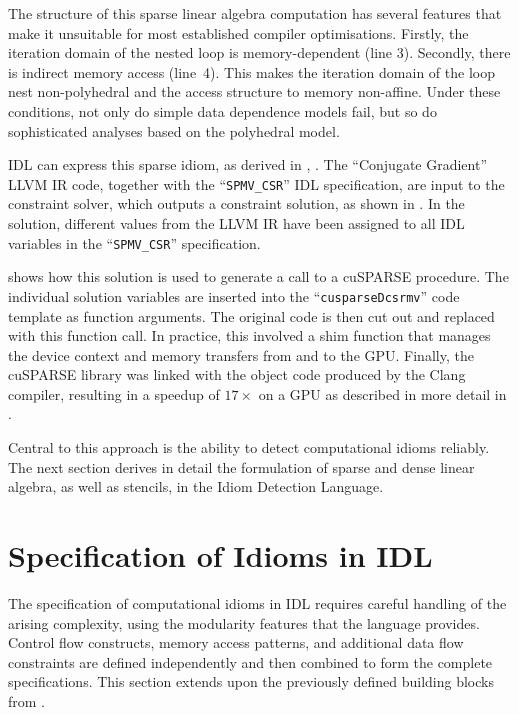     The structure of this sparse linear algebra computation has several features
    that make it unsuitable for most established compiler optimisations.
    Firstly, the iteration domain of the nested loop is memory-dependent
    (line 3).
    Secondly, there is indirect memory access (line~4).
    This makes the iteration domain of the loop nest non-polyhedral
    and the access structure to memory non-affine.
    Under these conditions, not only do simple data dependence models fail,
    but so do sophisticated analyses based on the polyhedral model.

    IDL can express this sparse idiom, as derived in ,
    .
    The ``Conjugate Gradient'' LLVM IR code, together with the
    ``{\tt SPMV\_CSR}'' IDL specification, are input to the constraint solver,
    which outputs a constraint solution, as shown in .
    In the solution, different values from the LLVM IR have been assigned to all
    IDL variables in the ``{\tt SPMV\_CSR}'' specification.

     shows how this solution is used to generate a
    call to a cuSPARSE procedure.
    The individual solution variables are inserted into the
    ``{\tt cusparseDcsrmv}'' code template as function arguments. 
    The original code is then cut out and replaced with this function call.
    In practice, this involved a shim function that manages the device context
    and memory transfers from and to the GPU.
    Finally, the cuSPARSE library was linked with the object code produced by
    the Clang compiler, resulting in a speedup of $17\times$ on a GPU as
    described in more detail in .

    Central to this approach is the ability to detect computational idioms
    reliably.
    The next section derives in detail the formulation of sparse and dense
    linear algebra, as well as stencils, in the Idiom Detection Language.

\begin{figure}[p]
    
\end{figure}

\section{Specification of Idioms in IDL}
\label{sec:idioms}

    The specification of computational idioms in IDL requires careful
    handling of the arising complexity, using the modularity features that
    the language provides.
    Control flow constructs, memory access patterns, and additional data flow
    constraints are defined independently and then combined to form the complete
    specifications.
    This section extends upon the previously defined building blocks from
    .

